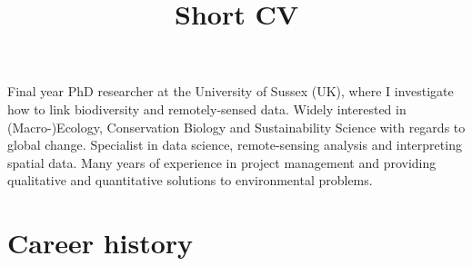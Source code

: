 \documentclass[12pt,a4paper,roman]{moderncv}        %
\title{Short CV}                               %
\begin{document}
\makecvtitle

\small{Final year PhD researcher at the University of Sussex (UK), where I investigate how to link biodiversity and remotely-sensed data. Widely interested in (Macro-)Ecology, Conservation Biology and Sustainability Science with regards to global change. Specialist in data science, remote-sensing analysis and interpreting spatial data. Many years of experience in project management and providing qualitative and quantitative solutions to environmental problems.}

\section{Career history}
\vspace{4pt}
\end{document}
